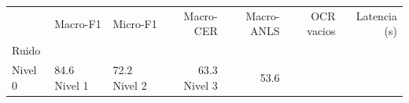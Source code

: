 \begin{tabular}{lllrrrr}
\toprule
 & Macro-F1 & Micro-F1 & Macro-CER & Macro-ANLS & OCR vacios & Latencia (s) \\
Ruido &  &  &  &  &  &  \\
\midrule
Nivel 0 & 84.6%
Nivel 1 & 72.2%
Nivel 2 & 63.3%
Nivel 3 & 53.6%
\bottomrule
\end{tabular}
